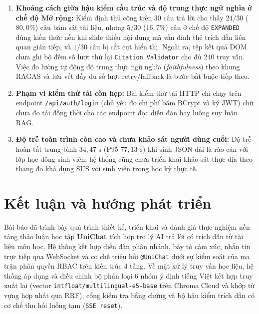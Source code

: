 \documentclass{IEEEtran}
\begin{document}
\begin{enumerate}
    \item \textbf{Khoảng cách giữa hậu kiểm cấu trúc và độ trung thực ngữ nghĩa ở chế độ Mở rộng:} Kiểm định thủ công trên 30 câu trả lời cho thấy $24/30$ ($80{,}0\%$) câu bám sát tài liệu, nhưng $5/30$ ($16{,}7\%$) câu ở chế độ \texttt{EXPANDED} dùng kiến thức nền khi slide thiếu nội dung mà vẫn đính thẻ trích dẫn liên quan gián tiếp, và $1/30$ câu bị cắt cụt hiển thị. Ngoài ra, tệp kết quả DOM chưa ghi bộ đếm số lượt thử lại \texttt{Citation Validator} cho đủ 240 truy vấn. Việc đo lường tự động độ trung thực ngữ nghĩa (\textit{faithfulness}) theo khung RAGAS \cite{es2024ragas} và lưu vết đầy đủ số lượt retry/fallback là bước bắt buộc tiếp theo.
    \item \textbf{Phạm vi kiểm thử tải còn hẹp:} Bài kiểm thử tải HTTP chỉ chạy trên endpoint \texttt{/api/auth/login} (chủ yếu đo chi phí băm BCrypt và ký JWT) chứ chưa đo tải đồng thời cho các endpoint đọc diễn đàn hay luồng suy luận RAG.
    \item \textbf{Độ trễ toàn trình còn cao và chưa khảo sát người dùng cuối:} Độ trễ hoàn tất trung bình $34{,}47\text{~s}$ (P95 $77{,}13\text{~s}$) khi sinh JSON dài là rào cản với lớp học đông sinh viên; hệ thống cũng chưa triển khai khảo sát thực địa theo thang đo khả dụng SUS với sinh viên trong học kỳ thực tế.
\end{enumerate}

\section{Kết luận và hướng phát triển}
\label{sec:conclusion}
Bài báo đã trình bày quá trình thiết kế, triển khai và đánh giá thực nghiệm nền tảng thảo luận học tập \textbf{UniChat} tích hợp trợ lý AI trả lời có trích dẫn từ tài liệu môn học. Hệ thống kết hợp diễn đàn phân nhánh, bày tỏ cảm xúc, nhắn tin trực tiếp qua WebSocket và cơ chế triệu hồi \texttt{@UniChat} dưới sự kiểm soát của ma trận phân quyền RBAC trên kiến trúc 4 tầng. Về mặt xử lý truy vấn học liệu, hệ thống áp dụng và điều chỉnh bộ phân loại 6 nhóm ý định tiếng Việt kết hợp truy xuất lai (vector \texttt{intfloat/multilingual-e5-base} trên Chroma Cloud và khớp từ vựng hợp nhất qua RRF), cổng kiểm tra bằng chứng và bộ hậu kiểm trích dẫn có cơ chế thu hồi luồng tạm (\texttt{SSE reset}).
\end{document}

